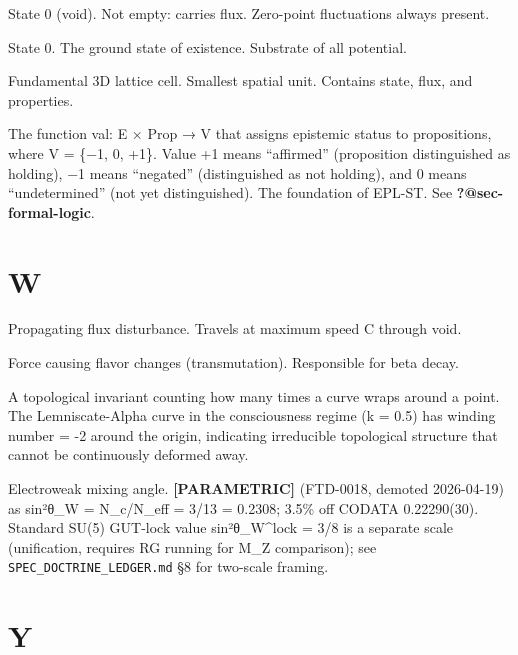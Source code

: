 \documentclass[
  11pt,
  letterpaper,
  twoside,
  openright]{book}
\providecommand{\tightlist}{%
  \setlength{\itemsep}{0pt}\setlength{\parskip}{0pt}}
\begin{document}
\begin{description}
\tightlist
\item[\textbf{Vacuum}]
State 0 (void). Not empty: carries flux. Zero-point fluctuations always
present.
\item[\textbf{Void}]
State 0. The ground state of existence. Substrate of all potential.
\item[\textbf{Voxel}]
Fundamental 3D lattice cell. Smallest spatial unit. Contains state,
flux, and properties.
\item[\textbf{Valuation Function (val)}]
The function val: E × Prop → V that assigns epistemic status to
propositions, where V = \{−1, 0, +1\}. Value +1 means ``affirmed''
(proposition distinguished as holding), −1 means ``negated''
(distinguished as not holding), and 0 means ``undetermined'' (not yet
distinguished). The foundation of EPL-ST. See
\textbf{?@sec-formal-logic}.
\end{description}

\section{W}\label{w}

\begin{description}
\tightlist
\item[\textbf{Wave}]
Propagating flux disturbance. Travels at maximum speed C through void.
\item[\textbf{Weak Force}]
Force causing flavor changes (transmutation). Responsible for beta
decay.
\item[\textbf{Winding Number}]
A topological invariant counting how many times a curve wraps around a
point. The Lemniscate-Alpha curve in the consciousness regime (k = 0.5)
has winding number = -2 around the origin, indicating irreducible
topological structure that cannot be continuously deformed away.
\item[\textbf{Weinberg Angle (θ\_W)}]
Electroweak mixing angle. \textbf{{[}PARAMETRIC{]}} (FTD-0018, demoted
2026-04-19) as sin²θ\_W = N\_c/N\_eff = 3/13 = 0.2308; 3.5\% off CODATA
0.22290(30). Standard SU(5) GUT-lock value sin²θ\_W\^{}lock = 3/8 is a
separate scale (unification, requires RG running for M\_Z comparison);
see \texttt{SPEC\_DOCTRINE\_LEDGER.md} §8 for two-scale framing.
\end{description}

\section{Y}\label{y}
\end{document}
